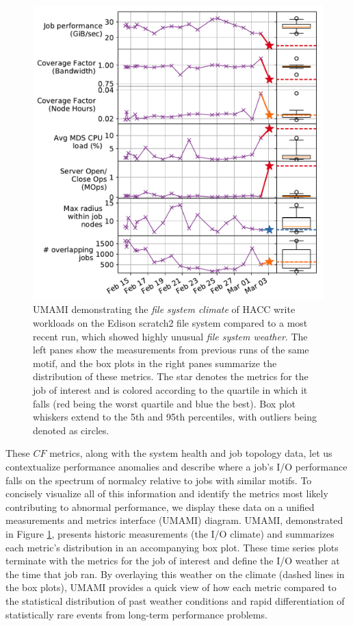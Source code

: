 \begin{figure}[t]
    \centering
    \includegraphics[width=1.0\columnwidth]{figs/umami-scratch2-hacc-write.pdf}
    \caption{UMAMI demonstrating the \emph{file system climate} of HACC write workloads on the Edison scratch2 file system compared to a most recent run, which showed highly unusual \emph{file system weather}.
    The left panes show the measurements from previous runs of the same motif, and the box plots in the right panes summarize the distribution of these metrics.
    The star denotes the metrics for the job of interest and is colored according to the quartile in which it falls (red being the worst quartile and blue the best).
    Box plot whiskers extend to the 5th and 95th percentiles, with outliers being denoted as circles.}
    \label{fig:umami-scratch2-hacc-write}
\vspace{-.2in}
\end{figure}

These $\mathit{CF}$ metrics, along with the system health and job topology data, let us contextualize performance anomalies and describe where a job's I/O performance falls on the spectrum of normalcy relative to jobs with similar motifs.
To concisely visualize all of this information and identify the metrics most likely contributing to abnormal performance, we display these data on a unified measurements and metrics interface (UMAMI) diagram.
UMAMI, demonstrated in Figure \ref{fig:umami-scratch2-hacc-write}, presents historic measurements (the I/O climate) and summarizes each metric's distribution in an accompanying box plot.
These time series plots terminate with the metrics for the job of interest and define the I/O weather at the time that job ran.
By overlaying this weather on the climate (dashed lines in the box plots), UMAMI provides a quick view of how each metric compared to the statistical distribution of past weather conditions and rapid differentiation of statistically rare events from long-term performance problems.%

